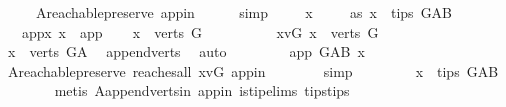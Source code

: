 \begin{isabellebody}
\ \ \ \ \ A{}{\isachardot}{\kern0pt}reachable{}{\isacharunderscore}{\kern0pt}preserve\ app{\isacharunderscore}{\kern0pt}in\isanewline
\ \ \ \ \isamarkupfalse%
\ simp\ \isanewline
\ \ \isamarkupfalse%
\ x\ \isanewline
\ \ \isamarkupfalse%
\ as{}{\isacharcolon}{\kern0pt}\ {\isachardoublequoteopen}x\ {\isasymin}\ tips\ G{\isacharunderscore}{\kern0pt}AB{\isachardoublequoteclose}\isanewline
\ \ \ app{\isacharunderscore}{\kern0pt}x{\isacharcolon}{\kern0pt}\ {\isachardoublequoteopen}x\ {\isasymnoteq}\ app{\isachardoublequoteclose}\isanewline
\ \ \isamarkupfalse%
\ {\isachardoublequoteopen}x\ {\isasymnotin}\ verts\ G{\isachardoublequoteclose}\isanewline
\ \ \isamarkupfalse%
\ \isanewline
\ \ \ \ \isamarkupfalse%
\ x{\isacharunderscore}{\kern0pt}vG{\isacharcolon}{\kern0pt}\ {\isachardoublequoteopen}x\ {\isasymin}\ verts\ G{\isachardoublequoteclose}\isanewline
\ \ \ \ \isamarkupfalse%
\ \isamarkupfalse%
\ {\isachardoublequoteopen}x\ {\isasymin}\ verts\ G{\isacharunderscore}{\kern0pt}A{\isachardoublequoteclose}\ \isamarkupfalse%
\ append{\isacharunderscore}{\kern0pt}verts\ \isamarkupfalse%
\ auto\ \isanewline
\ \ \ \ \isamarkupfalse%
\ \isamarkupfalse%
\ {\isachardoublequoteopen}app\ {\isasymrightarrow}\isactrlsup {\isacharplus}{\kern0pt}\isactrlbsub G{\isacharunderscore}{\kern0pt}AB\isactrlesub \ x{\isachardoublequoteclose}\ \isamarkupfalse%
\ A{}{\isachardot}{\kern0pt}reachable{}{\isacharunderscore}{\kern0pt}preserve\ reaches{\isacharunderscore}{\kern0pt}all\ x{\isacharunderscore}{\kern0pt}vG\ app{\isacharunderscore}{\kern0pt}in\isanewline
\ \ \ \ \ \ \isamarkupfalse%
\ simp\ \isanewline
\ \ \ \ \isamarkupfalse%
\ \isamarkupfalse%
\ {\isachardoublequoteopen}x\ {\isasymnotin}\ tips\ G{\isacharunderscore}{\kern0pt}AB{\isachardoublequoteclose}\isanewline
\ \ \ \ \ \ \isamarkupfalse%
\ {\isacharparenleft}{\kern0pt}metis\ A{}{\isachardot}{\kern0pt}append{\isacharunderscore}{\kern0pt}verts{\isacharunderscore}{\kern0pt}in\ app{\isacharunderscore}{\kern0pt}in\ is{\isacharunderscore}{\kern0pt}tip{\isachardot}{\kern0pt}elims{\isacharparenleft}{\kern0pt}{}{\isacharparenright}{\kern0pt}\ tips{\isacharunderscore}{\kern0pt}tips{\isacharparenright}{\kern0pt}\isanewline
\ \ \ \ \isamarkupfalse%

\end{isabellebody}

